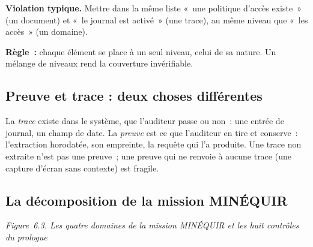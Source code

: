 \begin{boxalert}
\textbf{Violation typique.} Mettre dans la même liste «~une politique
d'accès existe~» (un document) et «~le journal est activé~» (une trace),
au même niveau que «~les accès~» (un domaine).

\smallskip
\textbf{Règle~:} chaque élément se place à un seul niveau, celui de sa
nature. Un mélange de niveaux rend la couverture invérifiable.
\end{boxalert}

\subsection{Preuve et trace : deux choses différentes}

La \emph{trace} existe dans le système, que l'auditeur passe ou non~: une
entrée de journal, un champ de date. La \emph{preuve} est ce que l'auditeur
en tire et conserve~: l'extraction horodatée, son empreinte, la requête
qui l'a produite. Une trace non extraite n'est pas une preuve~; une preuve
qui ne renvoie à aucune trace (une capture d'écran sans contexte) est
fragile.

\subsection{La décomposition de la mission MINÉQUIR}

\begin{center}
\end{center}
\vspace{-0.4em}
\begin{center}{\small\itshape Figure~6.3. Les quatre domaines de la
mission MINÉQUIR et les huit contrôles du prologue}\end{center}

